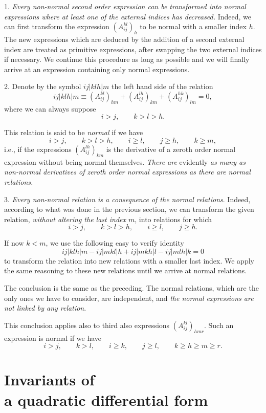 \documentclass[leqno,12pt]{article}
\theoremstyle{shape1}
\theoremstyle{shape0}
\theoremstyle{shape2}
\theoremstyle{definition}
\begin{document}
1. \emph{Every non-normal second order expression can be transformed into normal expressions where at least one of the external indices has decreased.} Indeed, we can first transform the expression $(A^{kl}_{ij})_{h}$ to be normal with a smaller index $h$. The new expressions which are deduced by the addition of a second external index are treated as primitive expressions, after swapping the two external indices if necessary. We continue this procedure as long as possible and we will finally arrive at an expression containing only normal expressions.

2. Denote by the symbol $ij|klh|m$ the left hand side of the relation
\[
ij|klh|m\equiv (A^{kl}_{ij})_{hm}+(A^{lh}_{ij})_{km}+(A^{hk}_{ij})_{lm}=0,
\]
where we can always suppose 
\[
i>j,\qquad k>l>h.
\]

This relation is said to be \emph{normal} if we have
\[
i>j,\qquad k>l>h,\qquad i\ge l,\qquad j\ge h,\qquad k\ge m,
\]
i.e., if the expressions $(A^{lh}_{ij})_{km}$ is the derivative of a zeroth order normal expression without being normal themselves. \emph{There are} evidently \emph{as many as non-normal derivatives of zeroth order normal expressions as there are normal relations.}

3. \emph{Every non-normal relation is a consequence of the normal relations}. Indeed, according to what was done in the previous section, we can transform the given relation, \emph{without altering the last index $m$}, into relations for which
\[
i>j,\qquad k>l>h,\qquad i\ge l,\qquad j\ge h.
\]

If now $k<m$, we use the following easy to verify identity
\[
ij|klh|m-ij|mkl|h+ij|mkh|l-ij|mlh|k=0
\]
to transform the relation into new relations with a smaller last index. We apply the same reasoning to these new relations until we arrive at normal relations.

The conclusion is the same as the preceding. The normal relations, which are the only ones we have to consider, are independent, and \emph{the normal expressions are not linked by any relation}.

This conclusion applies also to third also expressions $(A^{kl}_{ij})_{hmr}$. Such an expression is normal if we have
\begin{equation}
  \label{eq:30}
  i>j,\qquad k>l, \qquad i\ge k,\qquad j\ge l,\qquad k\ge h\ge m\ge r.
\end{equation}

\section[{Invariants of a quadratic differential form}]{Invariants of\\a quadratic differential form}
\label{sec:invar-quadr-diff}
\end{document}

